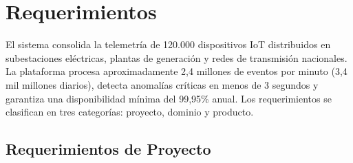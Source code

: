 \documentclass[12pt, letterpaper]{article}
\begin{document}
\hypersetup{pageanchor=true}

\setcounter{page}{1}

\section{Requerimientos}

El sistema consolida la telemetría de 120.000 dispositivos IoT distribuidos en subestaciones
eléctricas, plantas de generación y redes de transmisión nacionales. La plataforma procesa
aproximadamente 2,4 millones de eventos por minuto (3,4 mil millones diarios), detecta
anomalías críticas en menos de 3 segundos y garantiza una disponibilidad mínima del 99,95\%
anual. Los requerimientos se clasifican en tres categorías: proyecto, dominio y producto.

\subsection{Requerimientos de Proyecto}
\end{document}
